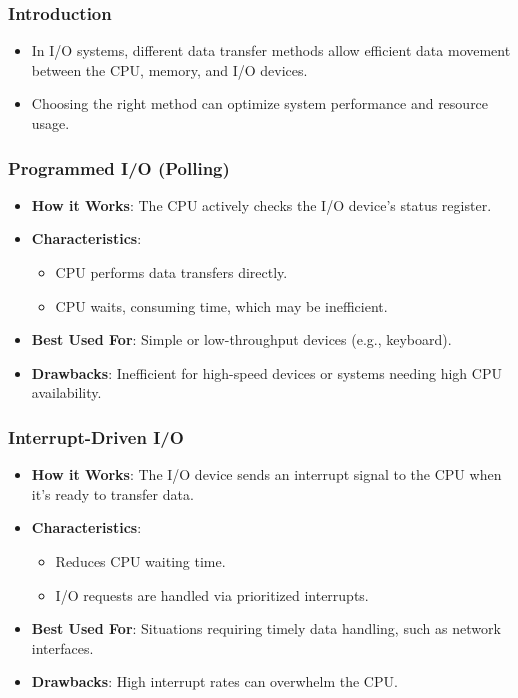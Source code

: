 \begin{frame}
    \frametitle{Introduction}
    \begin{itemize}
        \item In I/O systems, different data transfer methods allow efficient data movement between the CPU, memory, and I/O devices.
        \item Choosing the right method can optimize system performance and resource usage.
    \end{itemize}
\end{frame}

\begin{frame}
    \frametitle{Programmed I/O (Polling)}
    \begin{itemize}
        \item \textbf{How it Works}: The CPU actively checks the I/O device's status register.
        \item \textbf{Characteristics}:
            \begin{itemize}
                \item CPU performs data transfers directly.
                \item CPU waits, consuming time, which may be inefficient.
            \end{itemize}
        \item \textbf{Best Used For}: Simple or low-throughput devices (e.g., keyboard).
        \item \textbf{Drawbacks}: Inefficient for high-speed devices or systems needing high CPU availability.
    \end{itemize}
\end{frame}

\begin{frame}
    \frametitle{Interrupt-Driven I/O}
    \begin{itemize}
        \item \textbf{How it Works}: The I/O device sends an interrupt signal to the CPU when it’s ready to transfer data.
        \item \textbf{Characteristics}:
            \begin{itemize}
                \item Reduces CPU waiting time.
                \item I/O requests are handled via prioritized interrupts.
            \end{itemize}
        \item \textbf{Best Used For}: Situations requiring timely data handling, such as network interfaces.
        \item \textbf{Drawbacks}: High interrupt rates can overwhelm the CPU.
    \end{itemize}
\end{frame}

